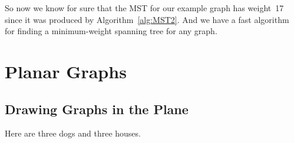 So now we know for sure that the MST for our example graph has
weight~17 since it was produced by Algorithm~\ref{alg:MST2}.  And we
have a fast algorithm for finding a minimum-weight spanning tree for
any graph.

\begin{problems}
\classproblems
{}

\homeworkproblems
{}
\end{problems}


\begin{problems}
\classproblems
{}


\homeworkproblems
{}

\examproblems
{}

\end{problems}


\begin{problems}
\classproblems
{}

\examproblems
{}

\homeworkproblems
{}
\end{problems}

\section{Planar Graphs}\label{planar_graphs_sec}

\subsection*{Drawing Graphs in the Plane}

Here are three dogs and three houses.

